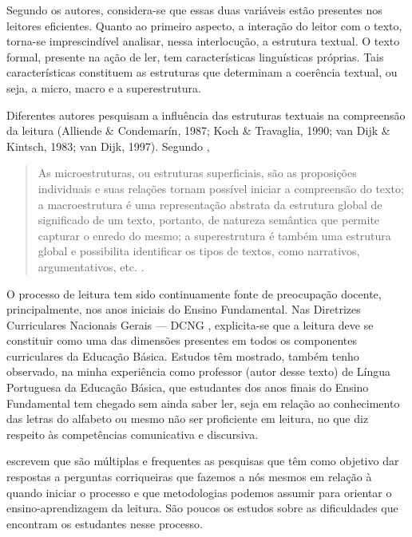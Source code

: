 \begin{refsection}
    Segundo os autores, considera-se que essas duas variáveis estão presentes nos leitores eficientes. Quanto ao primeiro aspecto, a interação do leitor com o texto, torna-se imprescindível analisar, nessa interlocução, a estrutura textual. O texto formal, presente na ação de ler, tem características linguísticas próprias. Tais características constituem as estruturas que determinam a coerência textual, ou seja, a micro, macro e a superestrutura.   

    Diferentes autores pesquisam a influência das estruturas textuais na compreensão da leitura (Alliende \& Condemarín, 1987; Koch \& Travaglia, 1990; van Dijk \& Kintsch, 1983; van Dijk, 1997).  Segundo \textcite{VanDijk1997},  

    \begin{quotation}
        As microestruturas, ou estruturas superficiais, são as proposições individuais e suas relações tornam possível iniciar a compreensão do texto; a macroestrutura é uma representação abstrata da estrutura global de significado de um texto, portanto, de natureza semântica que permite capturar o enredo do mesmo; a superestrutura é também uma estrutura global e possibilita identificar os tipos de textos, como narrativos, argumentativos, etc. \cite[p.~15]{JouAndSperb2003Leitura}.
    \end{quotation}

    O processo de leitura tem sido continuamente fonte de preocupação docente, principalmente, nos anos iniciais do Ensino Fundamental. Nas Diretrizes Curriculares Nacionais Gerais --- DCNG \cite{DiretrizesCur2013}, explicita-se que a leitura deve se constituir como uma das dimensões presentes em todos os componentes curriculares da Educação Básica. Estudos têm mostrado, também tenho observado, na minha experiência como professor (autor desse texto) de Língua Portuguesa da Educação Básica, que estudantes dos anos finais do Ensino Fundamental tem chegado sem ainda saber ler, seja em relação ao conhecimento das letras do alfabeto ou mesmo não ser proficiente em leitura, no que diz respeito às competências comunicativa e discursiva. 

    \textcite{RojasEtAl2009Dificuldades} escrevem que são múltiplas e frequentes as pesquisas que têm como objetivo dar respostas a perguntas corriqueiras que fazemos a nós mesmos em relação à quando iniciar o processo e que metodologias podemos assumir para orientar o ensino-aprendizagem da leitura. São poucos os estudos sobre as dificuldades que encontram os estudantes nesse processo. 


\end{refsection}
